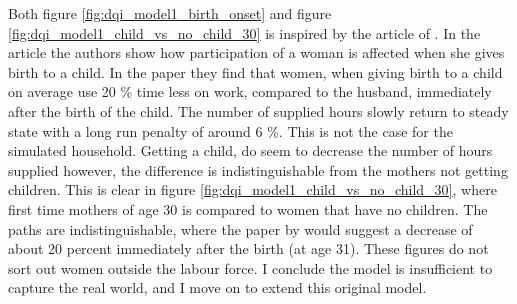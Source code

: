 Both figure \ref{fig:dqi_model1_birth_onset} and figure \ref{fig:dqi_model1_child_vs_no_child_30} is inspired by the article of \textcite{kleven_children_2019}. In the article the authors show how participation of a woman is affected when she gives birth to a child. In the paper they find that women,  when giving birth to a child on average use 20 \% time less on work, compared to the husband, immediately after the birth of the child. The number of supplied hours slowly return to steady state with a long run penalty of around 6 \%. This is not the case for the simulated household. Getting a child, do seem to decrease the number of hours supplied however, the difference is indistinguishable from the mothers not getting children. This is clear in figure \ref{fig:dqi_model1_child_vs_no_child_30}, where first time mothers of age 30 is compared to women that have no children. The paths are indistinguishable, where the paper by \textcite{kleven_children_2019} would suggest a decrease of about 20 percent immediately after the birth (at age 31). These figures do not sort out women outside the labour force. I conclude the model is insufficient to capture the real world, and I move on to extend this original model.


